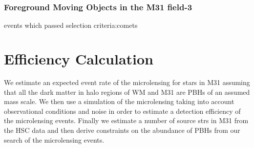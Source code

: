 \documentclass[iop, apj]{emulateapj}
\newcommand{\?}{\stackrel{?}{=}}
\begin{document}
\subsubsection{Foreground Moving Objects in the M31 field-3}
events which passed selection criteria:comets



\section{Efficiency Calculation}
We estimate an expected event rate of the microlensing for stars in M31 assuming that all the dark matter in halo regions of WM and M31 are PBHs of an assumed mass scale. 
We then use a simulation of the microlensing taking into account observational conditions and noise in order to estimate a detection efficiency of the microlensing events. 
Finally we estimate a number of source strs in M31 from the HSC data and then derive constraints on the abundance of PBHs from our search of the microlensing events. 
\end{document}
